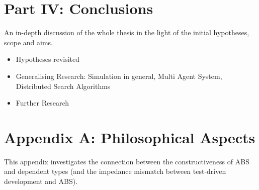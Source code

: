\section{Part IV: Conclusions}
An in-depth discussion of the whole thesis in the light of the initial hypotheses, scope and aims.
\begin{itemize}
	\item Hypotheses revisited
	\item Generalising Research: Simulation in general, Multi Agent System, Distributed Search Algorithms
	\item Further Research
\end{itemize}

\section{Appendix A: Philosophical Aspects}
This appendix investigates the connection between the constructiveness of ABS and dependent types (and the impedance mismatch between test-driven development and ABS).